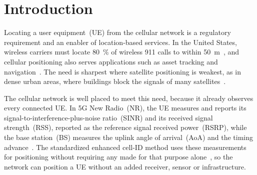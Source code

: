 \section{Introduction}
\label{sec:introduction}

Locating a user equipment~(UE) from the cellular network is a regulatory requirement and an enabler of location-based services. In the United States, wireless carriers must locate \SI{80}{\percent} of wireless 911 calls to within \SI{50}{\meter}~\cite{cfr47_9_10}, and cellular positioning also serves applications such as asset tracking and navigation~\cite{italiano2025tutorial}. The need is sharpest where satellite positioning is weakest, as in dense urban areas, where buildings block the signals of many satellites~\cite{groves2011shadow}.

The cellular network is well placed to meet this need, because it already observes every connected UE. In 5G New Radio~(NR), the UE measures and reports its signal-to-interference-plus-noise ratio~(SINR) and its received signal strength~(RSS), reported as the reference signal received power~(RSRP), while the base station~(BS) measures the uplink angle of arrival~(AoA) and the timing advance~\cite{3gpp38215}. The standardized enhanced cell-ID method uses these measurements for positioning without requiring any made for that purpose alone~\cite{3gpp38305}, so the network can position a UE without an added receiver, sensor or infrastructure.

